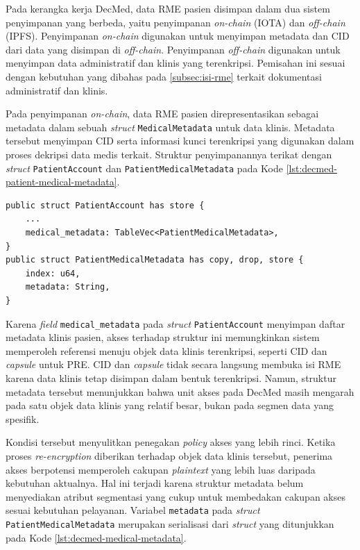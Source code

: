 \documentclass[bahasa, 12pt, a4paper, onecolumn, oneside, final]{report}
\begin{document}
Pada kerangka kerja DecMed, data RME pasien disimpan dalam dua sistem penyimpanan yang berbeda, yaitu penyimpanan \textit{on-chain} (IOTA) dan \textit{off-chain} (IPFS). Penyimpanan \textit{on-chain} digunakan untuk menyimpan metadata dan CID dari data yang disimpan di \textit{off-chain}. Penyimpanan \textit{off-chain} digunakan untuk menyimpan data administratif dan klinis yang terenkripsi. Pemisahan ini sesuai dengan kebutuhan yang dibahas pada \ref{subsec:isi-rme} terkait dokumentasi administratif dan klinis.

Pada penyimpanan \textit{on-chain}, data RME pasien direpresentasikan sebagai metadata dalam sebuah \textit{struct} \texttt{MedicalMetadata} untuk data klinis. Metadata tersebut menyimpan CID serta informasi kunci terenkripsi yang digunakan dalam proses dekripsi data medis terkait. Struktur penyimpanannya terikat dengan \textit{struct} \texttt{PatientAccount} dan \texttt{PatientMedicalMetadata} pada Kode \ref{lst:decmed-patient-medical-metadata}.

\begin{lstlisting}[language=Move, caption={Struktur metadata medis pasien pada DecMed}, label={lst:decmed-patient-medical-metadata}]
public struct PatientAccount has store {
    ...
    medical_metadata: TableVec<PatientMedicalMetadata>,
}
public struct PatientMedicalMetadata has copy, drop, store {
    index: u64,
    metadata: String,
}
\end{lstlisting}

Karena \textit{field} \texttt{medical\_metadata} pada \textit{struct} \texttt{PatientAccount} menyimpan daftar metadata klinis pasien, akses terhadap struktur ini memungkinkan sistem memperoleh referensi menuju objek data klinis terenkripsi, seperti CID dan \textit{capsule} untuk PRE. CID dan \textit{capsule} tidak secara langsung membuka isi RME karena data klinis tetap disimpan dalam bentuk terenkripsi. Namun, struktur metadata tersebut menunjukkan bahwa unit akses pada DecMed masih mengarah pada satu objek data klinis yang relatif besar, bukan pada segmen data yang spesifik.

Kondisi tersebut menyulitkan penegakan \textit{policy} akses yang lebih rinci. Ketika proses \textit{re-encryption} diberikan terhadap objek data klinis tersebut, penerima akses berpotensi memperoleh cakupan \textit{plaintext} yang lebih luas daripada kebutuhan aktualnya. Hal ini terjadi karena struktur metadata belum menyediakan atribut segmentasi yang cukup untuk membedakan cakupan akses sesuai kebutuhan pelayanan. Variabel \texttt{metadata} pada \textit{struct} \texttt{PatientMedicalMetadata} merupakan serialisasi dari \textit{struct} yang ditunjukkan pada Kode \ref{lst:decmed-medical-metadata}.
\end{document}

